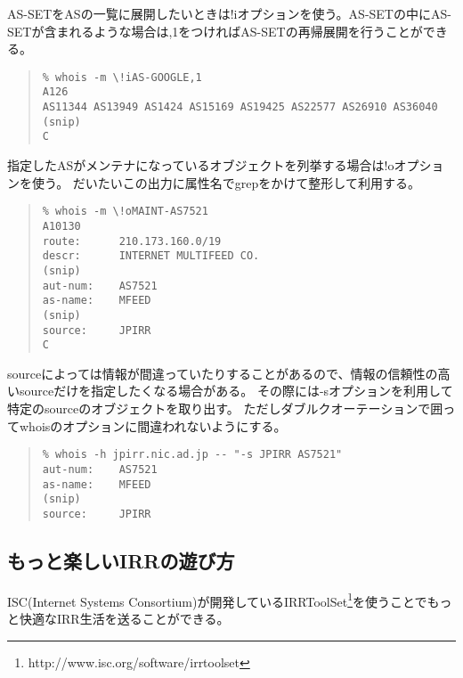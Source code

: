 AS-SETをASの一覧に展開したいときは!iオプションを使う。AS-SETの中にAS-SETが含まれるような場合は,1をつければAS-SETの再帰展開を行うことができる。

\begin{quote}
\begin{minilinespace}
\begin{verbatim}
% whois -m \!iAS-GOOGLE,1 
A126
AS11344 AS13949 AS1424 AS15169 AS19425 AS22577 AS26910 AS36040 (snip)
C
\end{verbatim}
\end{minilinespace}
\end{quote}

指定したASがメンテナになっているオブジェクトを列挙する場合は!oオプションを使う。
だいたいこの出力に属性名でgrepをかけて整形して利用する。

\begin{quote}
\begin{minilinespace}
\begin{verbatim}
% whois -m \!oMAINT-AS7521 
A10130
route:      210.173.160.0/19
descr:      INTERNET MULTIFEED CO.
(snip)
aut-num:    AS7521
as-name:    MFEED
(snip)
source:     JPIRR
C
\end{verbatim}
\end{minilinespace}
\end{quote}

sourceによっては情報が間違っていたりすることがあるので、情報の信頼性の高いsourceだけを指定したくなる場合がある。
その際には-sオプションを利用して特定のsourceのオブジェクトを取り出す。
ただしダブルクオーテーションで囲ってwhoisのオプションに間違われないようにする。

\begin{quote}
\begin{minilinespace}
\begin{verbatim}
% whois -h jpirr.nic.ad.jp -- "-s JPIRR AS7521"
aut-num:    AS7521
as-name:    MFEED
(snip)
source:     JPIRR
\end{verbatim}
\end{minilinespace}
\end{quote}

\subsection{もっと楽しいIRRの遊び方}

ISC(Internet Systems Consortium)が開発しているIRRToolSet\footnote{http://www.isc.org/software/irrtoolset}を使うことでもっと快適なIRR生活を送ることができる。

